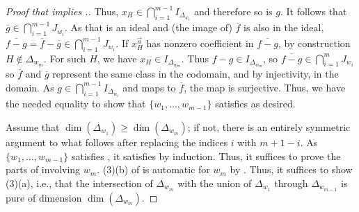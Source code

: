 \begin{proof}[Proof that  implies .]
    Thus, $x_H\in \bigcap_{i=1}^{m-1}I_{\Delta_{w_i}}$ and therefore so is $g$.
    It follows that $\overline{g}\in \bigcap_{i=1}^{m-1}J_{w_i}$.
    As that is an ideal and (the image of) $\overline{f}$ is also in the ideal, $\overline{f-g} = \overline{f}-\overline{g}\in \bigcap_{i=1}^{m-1}J_{w_i}$.
    If $x_H^{\vec{a}}$ has nonzero coefficient in $\overline{f-g}$, by construction $H\not\in \Delta_{w_m}$.
    For such $H$, we have $x_H \in I_{\Delta_{w_m}}$.
    Thus $f-g\in I_{\Delta_{w_m}}$, so $\overline{f-g}\in\bigcap_{i=1}^m J_{w_i}$ so $\overline{f}$ and $\overline{g}$ represent the same class in the codomain, and by injectivity, in the domain.
    As $g \in \bigcap_{i=1}^{m-1}I_{\Delta_{w_i}}$ and maps to $\overline{f}$, the map is surjective. 
    Thus, we have the needed equality to show that $\{w_1,\dots,w_{m-1}\}$ satisfies  as desired.    

    Assume that $\dim(\Delta_{w_1})\geq \dim(\Delta_{w_m})$; if not, there is an entirely symmetric argument to what follows after replacing the indices $i$ with $m+1-i$. 
    As $\{w_1,\dots,w_{m-1}\}$ satisfies , it satisfies  by induction. 
    Thus, it suffices to prove the parts of  involving $w_m$.
    (3)(b) of  is automatic for $w_m$ by .
    Thus, it suffices to show (3)(a), i.e.,  that the intersection of $\Delta_{w_m}$ with the union of $\Delta_{w_1}$ through $\Delta_{w_{m-1}}$ is pure of dimension $\dim(\Delta_{w_m})$. 


\end{proof}
